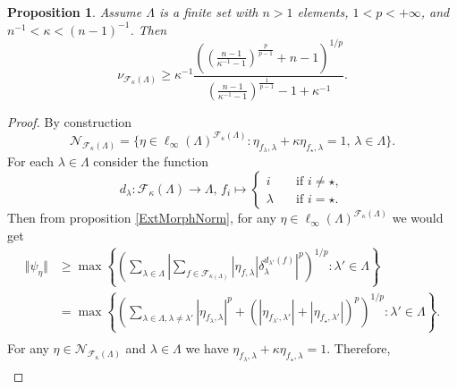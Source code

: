 \documentclass[12pt]{article}
\newtheorem{proposition}[theorem]{Proposition}
\begin{document}
\begin{proposition}\label{ExtMorphsNormLwrBnd}
    Assume $\Lambda$ is a finite set with $n > 1$ elements, $1 < p < +\infty$, 
    and $n^{-1} < \kappa < (n-1)^{-1}$. Then
    \[
        \nu_{\mathcal{F}_{\kappa}(\Lambda)}
        \geq 
        \kappa^{-1}\frac{
            \left(
                \left(\frac{n-1}{\kappa^{-1}-1}\right)^{\frac{p}{p-1}}+n-1
            \right)^{1/p}
        }{
            \left(\frac{n-1}{\kappa^{-1}-1}\right)^{\frac{1}{p-1}}-1+\kappa^{-1}
        }.
    \]
\end{proposition}
\begin{proof}
    By construction
    \[
        \mathcal{N}_{\mathcal{F}_{\kappa}(\Lambda)}=\{
            \eta\in\ell_\infty(\Lambda)^{\mathcal{F}_{\kappa}(\Lambda)}:
            \eta_{f_\lambda,\lambda}+\kappa \eta_{f_\star, \lambda}=1,\, 
            \lambda\in\Lambda
        \}.
    \]
    For each $\lambda\in\Lambda$ consider the function
    \[
        d_\lambda:\mathcal{F}_\kappa(\Lambda)\to\Lambda,\,
        f_i\mapsto
        \begin{cases}
            i\quad &\text{if } i\neq \star,\\
            \lambda\quad &\text{if } i=\star.
        \end{cases}
    \]
    Then from proposition \ref{ExtMorphNorm}, for 
    any $\eta\in\ell_\infty(\Lambda)^{\mathcal{F}_{\kappa}(\Lambda)}$ we 
    would get
    \[
    \begin{aligned}
        \Vert\psi_{\eta}\Vert
        &\geq\max\left\{
            \left(\sum_{\lambda\in\Lambda}
                \left|
                    \sum_{f\in\mathcal{F}_{\kappa(\Lambda)}} 
                        |\eta_{f,\lambda}|\delta_{\lambda}^{d_{\lambda'}(f)}
                \right|^p
            \right)^{1/p}:
            \lambda'\in\Lambda
        \right\} \\
        &=\max\left\{
            \left(
                \sum_{\lambda\in\Lambda,\lambda\neq \lambda'} 
                    |\eta_{f_\lambda,\lambda}|^p+
                    (|\eta_{f_{\lambda'},\lambda'}|+|\eta_{f_\star,\lambda'}|)^p
            \right)^{1/p}:
            \lambda'\in\Lambda
        \right\}. \\
    \end{aligned}
    \]
    For any $\eta\in\mathcal{N}_{\mathcal{F}_{\kappa}(\Lambda)}$ 
    and $\lambda\in\Lambda$ we 
    have $\eta_{f_\lambda,\lambda}+\kappa \eta_{f_\star, \lambda}=1$. 
    Therefore,
    \[
    \begin{aligned}

\end{aligned}\]
\end{proof}
\end{document}
